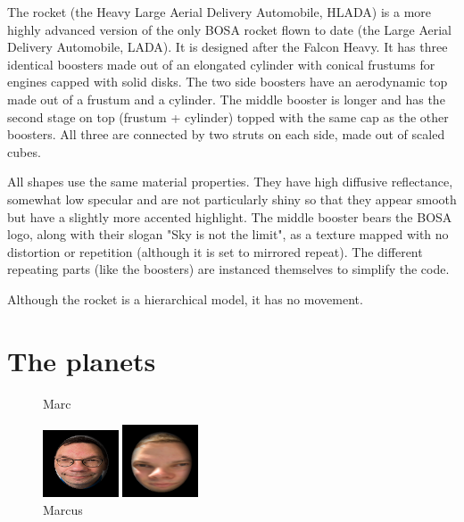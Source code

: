 \documentclass[10pt]{article}
\begin{document}
        The rocket (the Heavy Large Aerial Delivery Automobile, HLADA) is a
        more highly advanced version of the only BOSA rocket flown to date (the
        Large Aerial Delivery Automobile, LADA). It is designed after the
        Falcon Heavy. It has three identical boosters made out of an elongated
        cylinder with conical frustums for engines capped with solid disks. The
        two side boosters have an aerodynamic top made out of a frustum and a
        cylinder. The middle booster is longer and has the second stage on top
        (frustum + cylinder) topped with the same cap as the other boosters.
        All three are connected by two struts on each side, made out of
        scaled cubes.

        All shapes use the same material properties. They have high diffusive
        reflectance, somewhat low specular and are not particularly shiny so
        that they appear smooth but have a slightly more accented highlight.
        The middle booster bears the BOSA logo, along with their slogan "Sky is
        not the limit", as a texture mapped with no distortion or repetition
        (although it is set to mirrored repeat). The different repeating parts
        (like the boosters) are instanced themselves to simplify the code.

        Although the rocket is a hierarchical model, it has no movement.


    \section{The planets}

        \begin{figure}
                \caption{Marc}
                \includegraphics[width=0.2\textwidth]{marc}
                \caption{Marcus}
                \includegraphics[width=0.2\textwidth]{Marcus}
        \end{figure}
\end{document}
